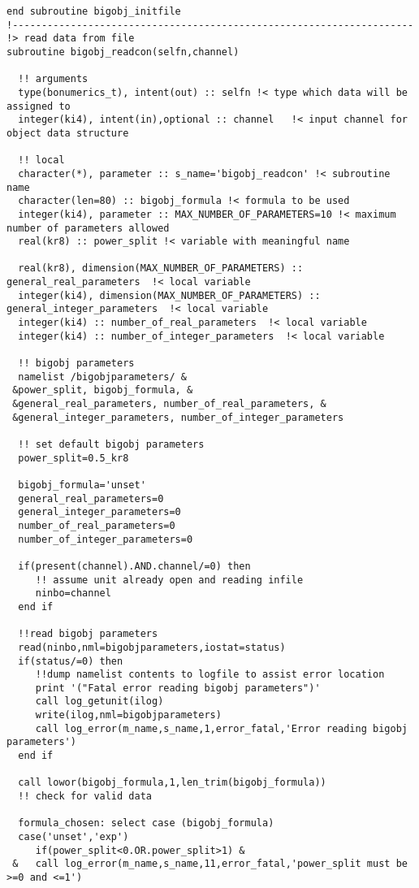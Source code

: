 \begin{verbatim}
end subroutine bigobj_initfile
!---------------------------------------------------------------------
!> read data from file
subroutine bigobj_readcon(selfn,channel)

  !! arguments
  type(bonumerics_t), intent(out) :: selfn !< type which data will be assigned to
  integer(ki4), intent(in),optional :: channel   !< input channel for object data structure

  !! local
  character(*), parameter :: s_name='bigobj_readcon' !< subroutine name
  character(len=80) :: bigobj_formula !< formula to be used
  integer(ki4), parameter :: MAX_NUMBER_OF_PARAMETERS=10 !< maximum number of parameters allowed
  real(kr8) :: power_split !< variable with meaningful name

  real(kr8), dimension(MAX_NUMBER_OF_PARAMETERS) :: general_real_parameters  !< local variable
  integer(ki4), dimension(MAX_NUMBER_OF_PARAMETERS) :: general_integer_parameters  !< local variable
  integer(ki4) :: number_of_real_parameters  !< local variable
  integer(ki4) :: number_of_integer_parameters  !< local variable

  !! bigobj parameters
  namelist /bigobjparameters/ &
 &power_split, bigobj_formula, &
 &general_real_parameters, number_of_real_parameters, &
 &general_integer_parameters, number_of_integer_parameters

  !! set default bigobj parameters
  power_split=0.5_kr8

  bigobj_formula='unset'
  general_real_parameters=0
  general_integer_parameters=0
  number_of_real_parameters=0
  number_of_integer_parameters=0

  if(present(channel).AND.channel/=0) then
     !! assume unit already open and reading infile
     ninbo=channel
  end if

  !!read bigobj parameters
  read(ninbo,nml=bigobjparameters,iostat=status)
  if(status/=0) then
     !!dump namelist contents to logfile to assist error location
     print '("Fatal error reading bigobj parameters")'
     call log_getunit(ilog)
     write(ilog,nml=bigobjparameters)
     call log_error(m_name,s_name,1,error_fatal,'Error reading bigobj parameters')
  end if

  call lowor(bigobj_formula,1,len_trim(bigobj_formula))
  !! check for valid data

  formula_chosen: select case (bigobj_formula)
  case('unset','exp')
     if(power_split<0.OR.power_split>1) &
 &   call log_error(m_name,s_name,11,error_fatal,'power_split must be >=0 and <=1')


\end{verbatim}
